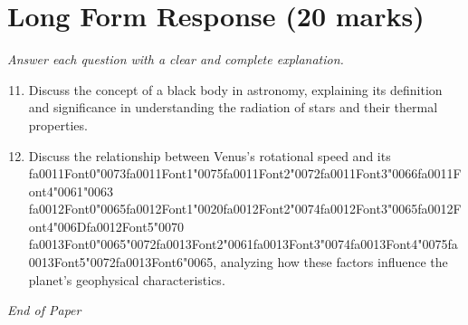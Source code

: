 \documentclass[12pt]{article}
\begin{document}
\section*{Long Form Response (20 marks)}
\textit{Answer each question with a clear and complete explanation.}
\begin{enumerate}[label=\arabic*.]
\setcounter{enumi}{10}
\item Discuss the concept of a black body in astronomy, explaining its definition and
significance in understanding the radiation of stars and their thermal properties.
\item Discuss the relationship between Venus's rotational speed and its {\csname fa0011Font0\endcsname\char"0073}{\csname fa0011Font1\endcsname\char"0075}{\csname fa0011Font2\endcsname\char"0072}{\csname fa0011Font3\endcsname\char"0066}{\csname fa0011Font4\endcsname\char"0061}{\char"0063} {\csname fa0012Font0\endcsname\char"0065}{\csname fa0012Font1\endcsname\char"0020}{\csname fa0012Font2\endcsname\char"0074}{\csname fa0012Font3\endcsname\char"0065}{\csname fa0012Font4\endcsname\char"006D}{\csname fa0012Font5\endcsname\char"0070} {\csname fa0013Font0\endcsname\char"0065}{\char"0072}{\csname fa0013Font2\endcsname\char"0061}{\csname fa0013Font3\endcsname\char"0074}{\csname fa0013Font4\endcsname\char"0075}{\csname fa0013Font5\endcsname\char"0072}{\csname fa0013Font6\endcsname\char"0065},
analyzing how these factors influence the planet's geophysical characteristics.
\end{enumerate}

\vfill
\noindent\textit{End of Paper}
\end{document}
